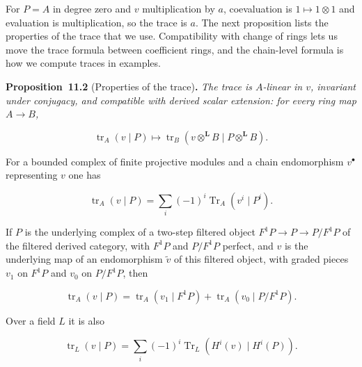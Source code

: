 \documentclass[11pt]{article}
\newenvironment{bpstatement}[2]{\par\addvspace{0.6\baselineskip}\noindent\textbf{#1}#2\textbf{.}\enspace\ignorespaces}
  {\par\addvspace{0.4\baselineskip}}
\newenvironment{bpstatementit}[2]{\begin{bpstatement}{#1}{#2}\itshape\ignorespaces}{\end{bpstatement}}
\begin{document}
\label{bp6}%
For \(P=A\) in degree zero and \(v\) multiplication by \(a\), coevaluation is \(1\mapsto1\otimes1\) and evaluation is multiplication, so the trace is \(a\). The next proposition lists the properties of the trace that we use. Compatibility with change of rings lets us move the trace formula between coefficient rings, and the chain-level formula is how we compute traces in examples.

\label{bp7}%
\begin{bpstatementit}{Proposition~11.2}{ (Properties of the trace)}
The trace is \(A\)-linear in \(v\), invariant under conjugacy, and compatible with derived scalar extension: for every ring map \(A\to B\),

\[
\operatorname{tr}_A(v\mid P)\longmapsto
\operatorname{tr}_B(v\otimes^{\mathbf L} B\mid P\otimes^{\mathbf L} B).
\]

For a bounded complex of finite projective modules and a chain endomorphism \(v^\bullet\) representing \(v\) one has

\[
\operatorname{tr}_A(v\mid P)
=\sum_i(-1)^i\operatorname{Tr}_A(v^i\mid P^i).
\]

If \(P\) is the underlying complex of a two-step filtered object \(F^1P\to P\to P/F^1P\) of the filtered derived category, with \(F^1P\) and \(P/F^1P\) perfect, and \(v\) is the underlying map of an endomorphism \(\tilde v\) of this filtered object, with graded pieces \(v_1\) on \(F^1P\) and \(v_0\) on \(P/F^1P\), then

\[
\operatorname{tr}_A(v\mid P)=\operatorname{tr}_A(v_1\mid F^1P)
+\operatorname{tr}_A(v_0\mid P/F^1P).
\]

Over a field \(L\) it is also

\[
\operatorname{tr}_L(v\mid P)
=\sum_i(-1)^i\operatorname{Tr}_L(H^i(v)\mid H^i(P)).
\]
\end{bpstatementit}
\end{document}

